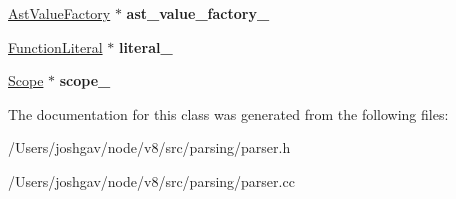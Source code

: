 \begin{DoxyCompactItemize}
\item 
\hyperlink{classv8_1_1internal_1_1_ast_value_factory}{Ast\+Value\+Factory} $\ast$ {\bfseries ast\+\_\+value\+\_\+factory\+\_\+}\hypertarget{classv8_1_1internal_1_1_parse_info_a3407e9790d3ee4e68bc181807e7849f1}{}\label{classv8_1_1internal_1_1_parse_info_a3407e9790d3ee4e68bc181807e7849f1}

\item 
\hyperlink{classv8_1_1internal_1_1_function_literal}{Function\+Literal} $\ast$ {\bfseries literal\+\_\+}\hypertarget{classv8_1_1internal_1_1_parse_info_a4647738d4c69e1e5cf2c6d9c931cbc75}{}\label{classv8_1_1internal_1_1_parse_info_a4647738d4c69e1e5cf2c6d9c931cbc75}

\item 
\hyperlink{classv8_1_1internal_1_1_scope}{Scope} $\ast$ {\bfseries scope\+\_\+}\hypertarget{classv8_1_1internal_1_1_parse_info_a8dfb6d4a4b792deb48eb03353fbb774e}{}\label{classv8_1_1internal_1_1_parse_info_a8dfb6d4a4b792deb48eb03353fbb774e}

\end{DoxyCompactItemize}


The documentation for this class was generated from the following files\+:\begin{DoxyCompactItemize}
\item 
/\+Users/joshgav/node/v8/src/parsing/parser.\+h\item 
/\+Users/joshgav/node/v8/src/parsing/parser.\+cc\end{DoxyCompactItemize}
